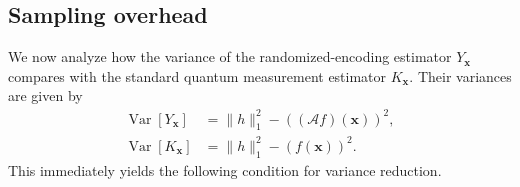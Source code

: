 \documentclass[%
 reprint,
 amsmath,amssymb,
 aps,
 pra,
]{revtex4-2}
\theoremstyle{definition}
\begin{document}



\subsection{Sampling overhead}
\label{sec:sampling_overhead}

We now analyze how the variance of the randomized-encoding estimator \(Y_{\bm{x}}\) compares with the standard quantum measurement estimator \(K_{\bm{x}}\). Their variances are given by
\begin{align}
\operatorname{Var}\left[Y_{\bm{x}}\right]&=
\|h\|_1^2-((\mathcal{A}f)(\bm{x}))^2, \\
\operatorname{Var}[K_{\bm{x}}]&=
\|h\|_1^2-(f(\bm{x}))^2.
\end{align}
This immediately yields the following condition for variance reduction.
\end{document}
